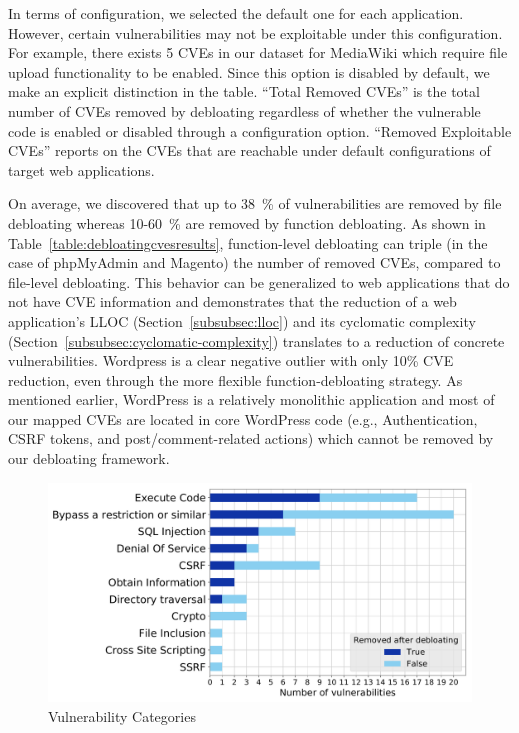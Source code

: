 In terms of configuration, we selected the default one for each application.
However, certain vulnerabilities may not be exploitable under this configuration.
For example, there exists 5 CVEs in our dataset for MediaWiki which require file upload functionality to be enabled. Since this option is disabled by default, we make an explicit distinction in the table.
``Total Removed CVEs'' is the total number of CVEs removed by debloating regardless of whether the vulnerable code is enabled or disabled through a configuration option. ``Removed Exploitable CVEs'' reports on the CVEs that are reachable under default configurations of target web applications.

On average, we discovered that up to 38~\% of vulnerabilities are removed by
file debloating whereas 10-60~\% are removed by function debloating. As
shown in Table~\ref{table:debloatingcvesresults}, function-level debloating
can triple (in the case of phpMyAdmin and Magento) the number of removed CVEs, compared to file-level debloating. This
behavior can be generalized to web applications that do not have CVE
information and demonstrates that the reduction of a web application's
LLOC (Section~\ref{subsubsec:lloc}) and its cyclomatic complexity
(Section~\ref{subsubsec:cyclomatic-complexity}) translates to a reduction
of concrete vulnerabilities. Wordpress is a clear negative outlier with only
10\% CVE reduction, even through the more flexible function-debloating
strategy. As mentioned earlier, WordPress is a relatively monolithic
application and most of our mapped CVEs are located in core WordPress code (e.g.,
Authentication, CSRF tokens, and post/comment-related actions) which cannot
be removed by our debloating framework.

\begin{figure}[t]
  \includegraphics[width=\linewidth]{figures/vuln_per_category.pdf}
  \caption{Vulnerability Categories}
  \label{fig:vulnpercat}
\end{figure}

